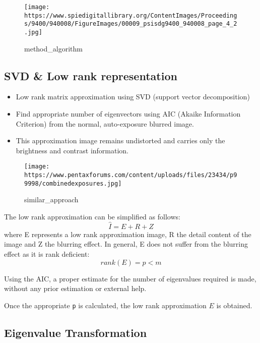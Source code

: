 \begin{figure}
  \begin{center}
  \texttt{[image: https://www.spiedigitallibrary.org/ContentImages/Proceedings/9400/940008/FigureImages/00009\_psisdg9400\_940008\_page\_4\_2.jpg]}
  \caption{method\_algorithm}
  \end{center}
\end{figure}

\hypertarget{svd-low-rank-representation}{%
\subsection{SVD \& Low rank
representation}\label{svd-low-rank-representation}}

\begin{itemize}
  \tightlist
  \item
  Low rank matrix approximation using SVD (support vector decomposition)
  \item
  Find appropriate number of eigenvectors using AIC (Akaike Information
  Criterion) from the normal, auto-exposure blurred image.
  \item
  This approximation image remains undistorted and carries only the
  brightness and contrast information.
\end{itemize}

\begin{figure}
  \begin{center}
  \texttt{[image: https://www.pentaxforums.com/content/uploads/files/23434/p99998/combinedexposures.jpg]}
  \caption{similar\_approach}
  \end{center}
\end{figure}

The low rank approximation can be simplified as follows:
\[\widehat{I} = E + R + Z \] where E represents a low rank approximation
image, R the detail content of the image and Z the blurring effect. In
general, E does not suffer from the blurring effect as it is rank
deficient: \[rank(E) = p < m\]

Using the AIC, a proper estimate for the number of eigenvalues required
is made, without any prior estimation or external help.

Once the appropriate \texttt{p} is calculated, the low rank
approximation \(E\) is obtained.

\hypertarget{eigenvalue-transformation}{%
\subsection{Eigenvalue Transformation}\label{eigenvalue-transformation}}

